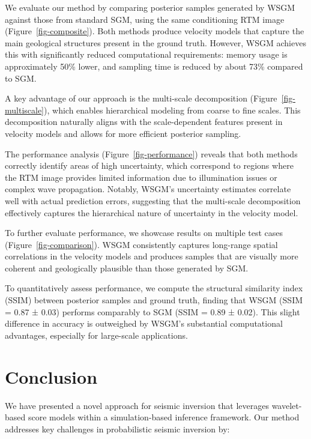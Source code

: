 \documentclass{IMAGE2025}
\begin{document}
We evaluate our method by comparing posterior samples generated by WSGM
against those from standard SGM, using the same conditioning RTM image
(Figure~\ref{fig-composite}). Both methods produce velocity models that
capture the main geological structures present in the ground truth.
However, WSGM achieves this with significantly reduced computational
requirements: memory usage is approximately 50\% lower, and sampling
time is reduced by about 73\% compared to SGM.

A key advantage of our approach is the multi-scale decomposition
(Figure~\ref{fig-multiscale}), which enables hierarchical modeling from
coarse to fine scales. This decomposition naturally aligns with the
scale-dependent features present in velocity models and allows for more
efficient posterior sampling.

The performance analysis (Figure~\ref{fig-performance}) reveals that
both methods correctly identify areas of high uncertainty, which
correspond to regions where the RTM image provides limited information
due to illumination issues or complex wave propagation. Notably, WSGM's
uncertainty estimates correlate well with actual prediction errors,
suggesting that the multi-scale decomposition effectively captures the
hierarchical nature of uncertainty in the velocity model.

To further evaluate performance, we showcase results on multiple test
cases (Figure~\ref{fig-comparison}). WSGM consistently captures
long-range spatial correlations in the velocity models and produces
samples that are visually more coherent and geologically plausible than
those generated by SGM.

To quantitatively assess performance, we compute the structural
similarity index (SSIM) between posterior samples and ground truth,
finding that WSGM (SSIM = 0.87 ± 0.03) performs comparably to SGM (SSIM
= 0.89 ± 0.02). This slight difference in accuracy is outweighed by
WSGM's substantial computational advantages, especially for large-scale
applications.

\section{Conclusion}\label{conclusion}

We have presented a novel approach for seismic inversion that leverages
wavelet-based score models within a simulation-based inference
framework. Our method addresses key challenges in probabilistic seismic
inversion by:
\end{document}
